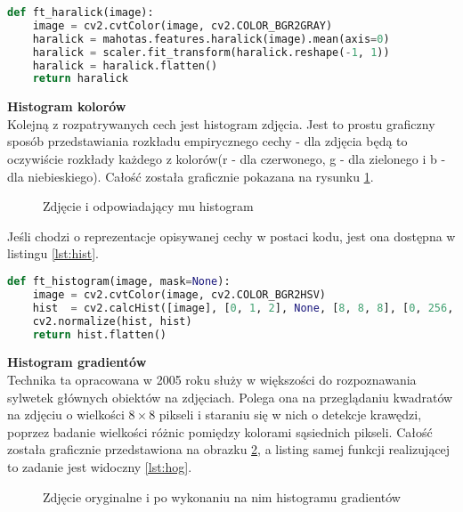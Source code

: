 \begin{lstlisting}[language=Python, caption=kod przeliczania cechy Haralicka, captionpos=b, label={lst:haralick}]
def ft_haralick(image):
	image = cv2.cvtColor(image, cv2.COLOR_BGR2GRAY)
	haralick = mahotas.features.haralick(image).mean(axis=0)
	haralick = scaler.fit_transform(haralick.reshape(-1, 1))
	haralick = haralick.flatten()
	return haralick
\end{lstlisting}

\textbf{Histogram kolorów} \\

Kolejną z rozpatrywanych cech jest histogram zdjęcia. Jest to prostu graficzny sposób przedstawiania rozkładu empirycznego cechy - dla zdjęcia będą to oczywiście rozkłady każdego z kolorów(r - dla czerwonego, g - dla zielonego i b - dla niebieskiego).  Całość została graficznie pokazana na rysunku \ref{fig:lena}.

\begin{figure}[h!]
	\centering
	\qquad
	\caption{Zdjęcie i odpowiadający mu histogram}
	\label{fig:lena}
\end{figure}

Jeśli chodzi o reprezentacje opisywanej cechy w postaci kodu, jest ona dostępna w listingu \ref{lst:hist}.

\begin{lstlisting}[language=Python, caption=Histogram, captionpos=b, label={lst:hist}]
def ft_histogram(image, mask=None):
	image = cv2.cvtColor(image, cv2.COLOR_BGR2HSV)
	hist  = cv2.calcHist([image], [0, 1, 2], None, [8, 8, 8], [0, 256, 0, 256, 0, 256])
	cv2.normalize(hist, hist)
	return hist.flatten()
\end{lstlisting}

\textbf{Histogram gradientów} \\
 
Technika ta opracowana w 2005 roku \cite{hog} służy w większości do rozpoznawania sylwetek głównych obiektów na zdjęciach. Polega ona na przeglądaniu kwadratów na zdjęciu o wielkości $8 \times 8$ pikseli i staraniu się w nich o detekcje krawędzi, poprzez badanie wielkości różnic pomiędzy kolorami sąsiednich pikseli. Całość została graficznie przedstawiona na obrazku \ref{fig:hog}, a listing samej funkcji realizującej to zadanie jest widoczny \ref{lst:hog}.

\begin{figure}[h!]
	\centering
	\qquad
	\caption{Zdjęcie oryginalne i po wykonaniu na nim histogramu gradientów}
	\label{fig:hog}
\end{figure}

